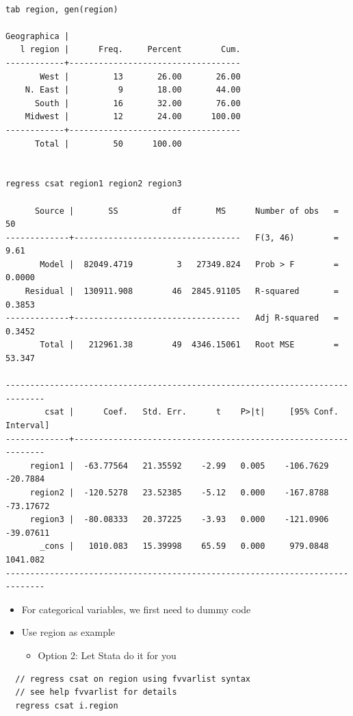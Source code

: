 \documentclass[]{book}
\providecommand{\tightlist}{%
  \setlength{\itemsep}{0pt}\setlength{\parskip}{0pt}}
\begin{document}
\begin{verbatim}

tab region, gen(region)

Geographica |
   l region |      Freq.     Percent        Cum.
------------+-----------------------------------
       West |         13       26.00       26.00
    N. East |          9       18.00       44.00
      South |         16       32.00       76.00
    Midwest |         12       24.00      100.00
------------+-----------------------------------
      Total |         50      100.00


regress csat region1 region2 region3

      Source |       SS           df       MS      Number of obs   =        50
-------------+----------------------------------   F(3, 46)        =      9.61
       Model |  82049.4719         3   27349.824   Prob > F        =    0.0000
    Residual |  130911.908        46  2845.91105   R-squared       =    0.3853
-------------+----------------------------------   Adj R-squared   =    0.3452
       Total |   212961.38        49  4346.15061   Root MSE        =    53.347

------------------------------------------------------------------------------
        csat |      Coef.   Std. Err.      t    P>|t|     [95% Conf. Interval]
-------------+----------------------------------------------------------------
     region1 |  -63.77564   21.35592    -2.99   0.005    -106.7629    -20.7884
     region2 |  -120.5278   23.52385    -5.12   0.000    -167.8788   -73.17672
     region3 |  -80.08333   20.37225    -3.93   0.000    -121.0906   -39.07611
       _cons |   1010.083   15.39998    65.59   0.000     979.0848    1041.082
------------------------------------------------------------------------------
\end{verbatim}

\begin{itemize}
\tightlist
\item
  For categorical variables, we first need to dummy code
\item
  Use region as example

  \begin{itemize}
  \tightlist
  \item
    Option 2: Let Stata do it for you
  \end{itemize}
\end{itemize}

\begin{verbatim}
  // regress csat on region using fvvarlist syntax
  // see help fvvarlist for details
  regress csat i.region
\end{verbatim}
\end{document}
